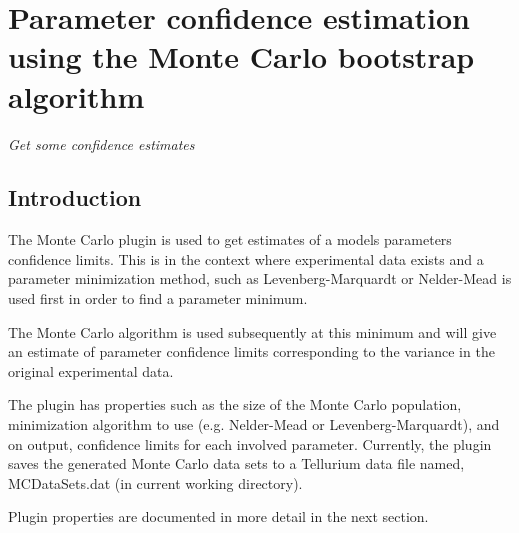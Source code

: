 
\newcommand{\pname}{Monte Carlo}

\chapter*{Parameter confidence estimation using the Monte Carlo bootstrap algorithm}
\setcounter{chapter}{1}
\emph{Get some confidence estimates}
\section{Introduction}
The Monte Carlo plugin is used to get estimates of a models parameters confidence limits. This is in the context where experimental data exists and a parameter minimization method, such as Levenberg-Marquardt or Nelder-Mead is used first in order to find a parameter minimum. 

The Monte Carlo algorithm is used subsequently at this minimum and will give an estimate of parameter confidence limits corresponding to the variance in the original experimental data.

The plugin has properties such as the size of the Monte Carlo population, minimization algorithm to use (e.g. Nelder-Mead or Levenberg-Marquardt), and on output, confidence limits for each involved parameter. Currently, the plugin saves the generated Monte Carlo data sets to a Tellurium data file named, MCDataSets.dat (in current working directory).

Plugin properties are documented in more detail in the next section.

